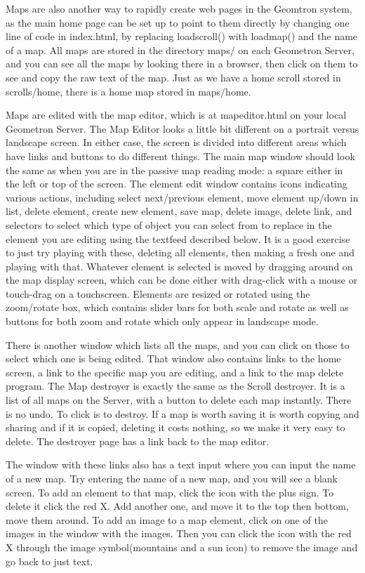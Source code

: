 Maps are also another way to rapidly create web pages in the Geomtron system, as the main home page can be set up to point to them directly by changing one line of code in index.html, by replacing loadscroll() with loadmap() and the name of a map.  All maps are stored in the directory maps/ on each Geometron Server, and you can see all the maps by looking there in a browser, then click on them to see and copy the raw text of the map.  Just as we have a home scroll stored in scrolls/home, there is a home map stored in maps/home.  

Maps are edited with the map editor, which is at mapeditor.html on your local Geometron Server.  The Map Editor looks a little bit different on a portrait versus landscape screen.  In either case, the screen is divided into different areas which have links and buttons to do different things.  The main map window should look the same as when you are in the passive map reading mode: a square either in the left or top of the screen.  The element edit window contains icons indicating various actions, including select next/previous element, move element up/down in list, delete element, create new element, save map, delete image, delete link, and selectors to select which type of object you can select from to replace in the element you are editing using the textfeed described below.  It is a good exercise to just try playing with these, deleting all elements, then making a fresh one and playing with that.  Whatever element is selected is moved by dragging around on the map display screen, which can be done either with drag-click with a mouse or touch-drag on a touchscreen.  Elements are resized or rotated using the zoom/rotate box, which contains slider bars for both scale and rotate as well as buttons for both zoom and rotate which only appear in landscape mode.

There is another window which lists all the maps, and you can click on those to select which one is being edited.  That window also contains links to the home screen, a link to the specific map you are editing, and a link to the map delete program.  The Map destroyer is exactly the same as the Scroll destroyer.  It is a list of all maps on the Server, with a button to delete each map instantly.  There is no undo.  To click is to destroy.  If a map is worth saving it is worth copying and sharing and if it is copied, deleting it costs nothing, so we make it very easy to delete.  The destroyer page has a link back to the map editor. 

The window with these links also has a text input where you can input the name of a new map.  Try entering the name of a new map, and you will see a blank screen.    To add an element to that map, click the icon with the plus sign.  To delete it click the red X.  Add another one, and move it to the top then bottom, move them around.  To add an image to a map element, click on one of the images in the window with the images. Then you can click the icon with the red X through the image symbol(mountains and a sun icon) to remove the image and go back to just text.  

